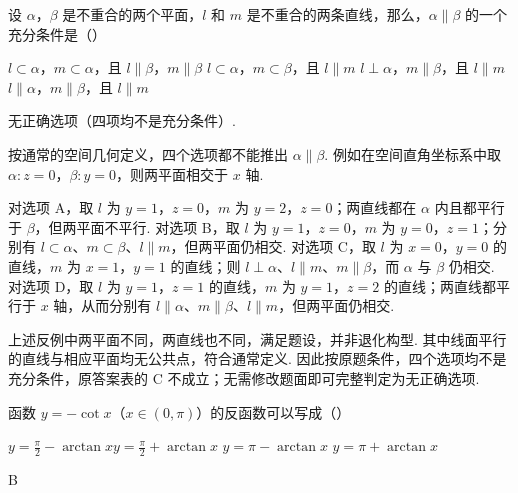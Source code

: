 \documentclass[UTF8,a4paper,oneside,11pt]{ctexbook}
\begin{document}
\begin{problem}

设 \(\alpha\)，\(\beta\) 是不重合的两个平面，\(l\) 和 \(m\) 是不重合的两条直线，那么，\(\alpha \parallel \beta\) 的一个充分条件是（\quad）

\choices
{\(l \subset \alpha \)，\(m \subset \alpha \)，且 \(l \parallel \beta \)，\(m \parallel \beta \)}
{\(l \subset \alpha \)，\(m \subset \beta \)，且 \(l \parallel m \)}
{\(l \perp \alpha \)，\(m \parallel \beta \)，且 \(l \parallel m \)}
{\(l \parallel \alpha \)，\(m \parallel \beta \)，且 \(l \parallel m \)}
\end{problem}

\begin{answer}
无正确选项（四项均不是充分条件）.
\end{answer}

\begin{solution}
按通常的空间几何定义，四个选项都不能推出 \(\alpha\parallel\beta\). 例如在空间直角坐标系中取 \(\alpha:z=0\)，\(\beta:y=0\)，则两平面相交于 \(x\) 轴.

对选项 A，取 \(l\) 为 \(y=1\)，\(z=0\)，\(m\) 为 \(y=2\)，\(z=0\)；两直线都在 \(\alpha\) 内且都平行于 \(\beta\)，但两平面不平行. 对选项 B，取 \(l\) 为 \(y=1\)，\(z=0\)，\(m\) 为 \(y=0\)，\(z=1\)；分别有 \(l\subset\alpha\)、\(m\subset\beta\)、\(l\parallel m\)，但两平面仍相交. 对选项 C，取 \(l\) 为 \(x=0\)，\(y=0\) 的直线，\(m\) 为 \(x=1\)，\(y=1\) 的直线；则 \(l\perp\alpha\)、\(l\parallel m\)、\(m\parallel\beta\)，而 \(\alpha\) 与 \(\beta\) 仍相交. 对选项 D，取 \(l\) 为 \(y=1\)，\(z=1\) 的直线，\(m\) 为 \(y=1\)，\(z=2\) 的直线；两直线都平行于 \(x\) 轴，从而分别有 \(l\parallel\alpha\)、\(m\parallel\beta\)、\(l\parallel m\)，但两平面仍相交.

上述反例中两平面不同，两直线也不同，满足题设，并非退化构型. 其中线面平行的直线与相应平面均无公共点，符合通常定义. 因此按原题条件，四个选项均不是充分条件，原答案表的 C 不成立；无需修改题面即可完整判定为无正确选项.
\end{solution}

\begin{problem}

函数 \(y=-\cot x\)（\(x\in(0,\pi)\)）的反函数可以写成（\quad）

\choices
{\(y=\frac{\pi}{2}-\arctan x \)}{\(y=\frac{\pi}
{2}+\arctan x \)}
{\(y=\pi-\arctan x \)}
{\(y=\pi+\arctan x \)}
\end{problem}

\begin{answer}
B
\end{answer}
\end{document}
